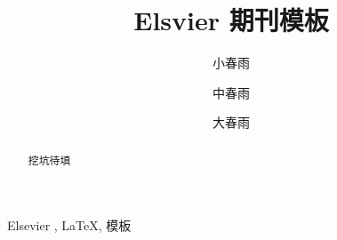 \documentclass[preprint,5p,twocolumn]{elsarticle}
\begin{document}
    
    \begin{frontmatter}
        \title{Elsvier 期刊模板}

        \author{小春雨}                     %
        \author{中春雨}
        \author{大春雨 }       %


        \address{地址}

        \begin{abstract}
            挖坑待填 
        \end{abstract}

        \begin{keyword}
            Elsevier \sep 
            \LaTeX \sep 
            模板
        \end{keyword}
    \end{frontmatter}


    

    
\end{document}
